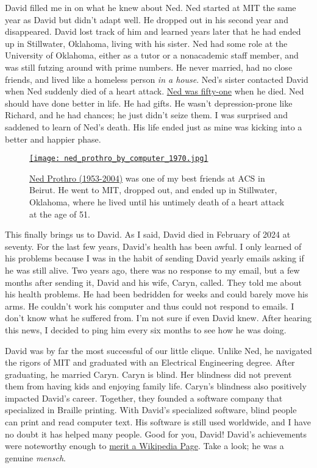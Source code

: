 David filled me in on what he knew about Ned. Ned started at MIT the
same year as David but didn't adapt well. He dropped out in his second
year and disappeared. David lost track of him and learned years later
that he had ended up in Stillwater, Oklahoma, living with his sister.
Ned had some role at the University of Oklahoma, either as a tutor or a
nonacademic staff member, and was still futzing around with prime
numbers. He never married, had no close friends, and lived like a
homeless person \emph{in a house}. Ned's sister contacted David when Ned
suddenly died of a heart attack.
\href{https://www.findagrave.com/memorial/11932084/edwin_terry-prothro}{Ned
was fifty-one} when he died. Ned should have done better in life. He had
gifts. He wasn't depression-prone like Richard, and he had chances; he
just didn't seize them. I was surprised and saddened to learn of Ned's
death. His life ended just as mine was kicking into a better and happier
phase.

\captionsetup[figure]{labelformat=empty}
\begin{SCfigure}
\centering
\href{https://conceptcontrol.smugmug.com/Places/Overseas/Beirut-Lebanon-1960s-1/i-sG6bVnH/A}{\texttt{[image: ned\_prothro\_by\_computer\_1970.jpg]}}
\caption[Ned Prothro (1953-2004)]{\href{https://www.findagrave.com/memorial/11932084/edwin_terry-prothro}{Ned
Prothro (1953-2004)} was one of my best friends at ACS in Beirut. He
went to MIT, dropped out, and ended up in Stillwater, Oklahoma, where he
lived until his untimely death of a heart attack at the age of 51.}
\label{fig:8196x2}
\end{SCfigure}
 

This finally brings us to David. As I said, David died in February of
2024 at seventy. For the last few years, David's health has been awful.
I only learned of his problems because I was in the habit of sending
David yearly emails asking if he was still alive. Two years ago, there
was no response to my email, but a few months after sending it, David
and his wife, Caryn, called. They told me about his health problems. He
had been bedridden for weeks and could barely move his arms. He couldn't
work his computer and thus could not respond to emails. I don't know
what he suffered from. I'm not sure if even David knew. After hearing
this news, I decided to ping him every six months to see how he was
doing.

David was by far the most successful of our little clique. Unlike Ned,
he navigated the rigors of MIT and graduated with an Electrical
Engineering degree. After graduating, he married Caryn. Caryn is blind.
Her blindness did not prevent them from having kids and enjoying family
life. Caryn's blindness also positively impacted David's career.
Together, they founded a software company that specialized in Braille
printing. With David's specialized software, blind people can print and
read computer text. His software is still used worldwide, and I have no
doubt it has helped many people. Good for you, David! David's
achievements were noteworthy enough to
\href{https://en.wikipedia.org/wiki/David_Holladay}{merit a Wikipedia
Page}. Take a look; he was a genuine \emph{mensch}.

